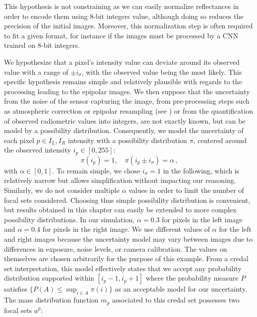 \begin{remark}
    This hypothesis is not constraining as we can easily normalize reflectances in order to encode them using 8-bit integers value, although doing so reduces the precision of the initial images. Moreover, this normalization step is often required to fit a given format, for instance if the images must be processed by a CNN trained on 8-bit integers.
\end{remark}

We hypothesize that a pixel's intensity value can deviate around its observed value with a range of $\pm i_\sigma$, with the observed value being the most likely. This specific hypothesis remains simple and relatively plausible with regards to the processing leading to the epipolar images. We then suppose that the uncertainty from the noise of the sensor capturing the image, from pre-processing steps such as atmospheric correction or epipolar resampling (see ) or from the quantification of observed radiometric values into integers, are not exactly known, but can be model by a possibility distribution. Consequently, we model the uncertainty of each pixel $p\in I_L,I_R$ intensity with a possibility distribution $\pi$, centered around the observed intensity $i_p\in[0,255]$:
\begin{equation}\label{eq:pixel_possibility}
    \pi(i_p)=1,\quad \pi(i_p\pm i_\sigma)=\alpha\,,
\end{equation}
with $\alpha \in [0,1]$. To remain simple, we chose $i_\sigma=1$ in the following, which is relatively narrow but allows simplification without impacting our reasoning. Similarly, we do not consider multiple $\alpha$ values in order to limit the number of focal sets considered. Choosing thus simple possibility distribution is convenient, but results obtained in this chapter can easily be extended to more complex possibility distributions. In our simulation, $\alpha = 0.3$ for pixels in the left image and $\alpha = 0.4$ for pixels in the right image. We use different values of $\alpha$ for the left and right images because the uncertainty model may vary between images due to differences in exposure, noise levels, or camera calibration. The values on themselves are chosen arbitrarily for the purpose of this example. From a credal set interpretation, this model effectively states that we accept any probability distribution supported within $[i_p - 1, i_p + 1]$ where the probability measure $P$ satisfies $\{P(A) \leq \sup_{i \in A} \pi(i)\}$ as an acceptable model for our uncertainty. The mass distribution function $m_p$ associated to this credal set possesses two focal sets $a^p$:
